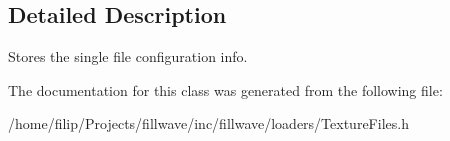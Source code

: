 \subsection{Detailed Description}
Stores the single file configuration info. 

The documentation for this class was generated from the following file\+:\begin{DoxyCompactItemize}
\item 
/home/filip/\+Projects/fillwave/inc/fillwave/loaders/Texture\+Files.\+h\end{DoxyCompactItemize}
